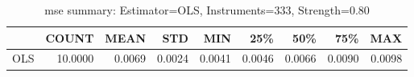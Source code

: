 \begin{table}[ht]
\centering
\caption{mse summary: Estimator=OLS, Instruments=333, Strength=0.80}
\begin{tabular}{lrrrrrrrr}
\toprule
 & COUNT & MEAN & STD & MIN & 25\% & 50\% & 75\% & MAX \\
\midrule
OLS & 10.0000 & 0.0069 & 0.0024 & 0.0041 & 0.0046 & 0.0066 & 0.0090 & 0.0098 \\
\bottomrule
\end{tabular}
\end{table}
